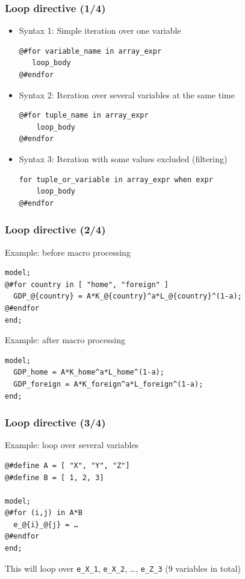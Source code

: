 \documentclass[handout,usepdftitle=false,xcolor=dvipsnames,aspectratio=169]{beamer}
\begin{document}
\begin{frame}[fragile]
  \frametitle{Loop directive (1/4)}
  \begin{itemize}
    \item Syntax 1: Simple iteration over one variable
          \small
          \begin{verbatim}
@#for variable_name in array_expr
   loop_body
@#endfor
\end{verbatim}
    \item Syntax 2: Iteration over several variables at the same time
          \small
          \begin{verbatim}
@#for tuple_name in array_expr
    loop_body
@#endfor
\end{verbatim}
    \item Syntax 3: Iteration with some values excluded (filtering)
          \small
          \begin{verbatim}
for tuple_or_variable in array_expr when expr
    loop_body
@#endfor
\end{verbatim}
  \end{itemize}
\end{frame}

\begin{frame}[fragile]
  \frametitle{Loop directive (2/4)}
  \begin{block}{Example: before macro processing}
    \small
    \begin{verbatim}
model;
@#for country in [ "home", "foreign" ]
  GDP_@{country} = A*K_@{country}^a*L_@{country}^(1-a);
@#endfor
end;
\end{verbatim}
    \normalsize
  \end{block}

  \begin{block}{Example: after macro processing}
    \small
    \begin{verbatim}
model;
  GDP_home = A*K_home^a*L_home^(1-a);
  GDP_foreign = A*K_foreign^a*L_foreign^(1-a);
end;
\end{verbatim}
    \normalsize
  \end{block}
\end{frame}

\begin{frame}[fragile]
  \frametitle{Loop directive (3/4)}
  \begin{block}{Example: loop over several variables}
    \small
    \begin{verbatim}
@#define A = [ "X", "Y", "Z"]
@#define B = [ 1, 2, 3]

model;
@#for (i,j) in A*B
  e_@{i}_@{j} = …
@#endfor
end;
\end{verbatim}
    \normalsize
    This will loop over \texttt{e\_X\_1}, \texttt{e\_X\_2}, …, \texttt{e\_Z\_3} (9
    variables in total)
  \end{block}
\end{frame}
\end{document}
